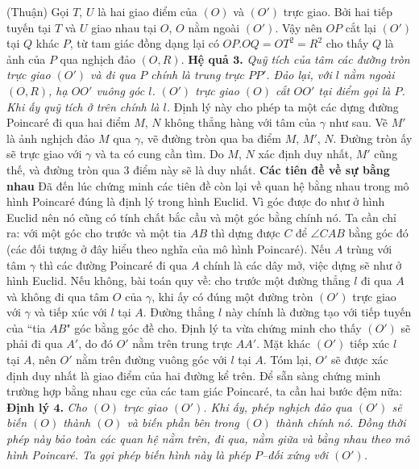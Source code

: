 \begin{multicols}{2}
	\vskip 0.1cm
	(Thuận) Gọi $T$, $U$ là hai giao điểm của $(O)$ và $(O')$ trực giao. Bởi hai tiếp tuyến tại $T$ và $U$ giao nhau tại $O$, $O$ nằm ngoài $(O')$. Vậy nên $OP$ cắt lại $(O')$ tại $Q$ khác $P$, từ tam giác đồng dạng lại có $OP.OQ = OT^2 = R^2$ cho thấy $Q$ là ảnh của $P$ qua nghịch đảo $(O, R)$.
	\vskip 0.1cm
	\textbf{\color{lichsutoanhoc}Hệ quả $\pmb{3}$.} \textit{ Quỹ tích của tâm các đường tròn trực giao $(O')$ và đi qua $P$ chính là trung trực $PP'$.
		Đảo lại, với $l$ nằm ngoài $(O, R)$, hạ $OO'$ vuông góc $l$. $(O')$ trực giao $(O)$ cắt $OO'$ tại điểm gọi là $P$. Khi ấy quỹ tích ở trên chính là $l$.}
	\vskip 0.1cm
	Định lý này cho phép ta một các dựng đường Poincar\'e đi qua hai điểm $M$, $N$ không thẳng hàng với tâm của $\gamma$ như sau. Vẽ $M'$ là ảnh nghịch đảo $M$ qua $\gamma$, vẽ đường tròn qua ba điểm $M$, $M'$, $N$. Đường tròn ấy sẽ trực giao với $\gamma$ và ta có cung cần tìm. Do $M$, $N$ xác định duy nhất, $M'$ cũng thế, và đường tròn qua $3$ điểm này sẽ là duy nhất.
	\vskip 0.1cm
	\textbf{\color{lichsutoanhoc}Các tiên đề về sự bằng nhau}
	\vskip 0.1cm
	Đã đến lúc chứng minh các tiên đề còn lại về quan hệ bằng nhau trong mô hình Poincar\'e đúng là định lý trong hình Euclid.
	\vskip 0.1cm
	Vì góc được đo như ở hình Euclid nên nó cũng có tính chất bắc cầu và một góc bằng chính nó. Ta cần chỉ ra: với một góc cho trước và một tia $AB$ thì dựng được $C$ để $ \angle CAB$ bằng góc đó (các đối tượng ở đây hiểu theo nghĩa của mô hình Poincar\'e). Nếu $A$ trùng với tâm $ \gamma$ thì các đường Poincar\'e đi qua $A$ chính là các dây mở, việc dựng sẽ như ở hình Euclid.
	\vskip 0.1cm
	Nếu không, bài toán quy về: cho trước một đường thẳng $l$ đi qua $A$ và không đi qua tâm $O$ của $\gamma$, khi ấy có đúng một đường tròn $(O')$ trực giao với $\gamma$ và tiếp xúc với $l$ tại $A$. Đường thẳng $l$ này chính là đường tạo với tiếp tuyến của ``tia $AB$" góc bằng góc đề cho. 
	\vskip 0.1cm
	Định lý ta vừa chứng minh cho thấy $(O')$ sẽ phải đi qua $A'$, do đó $O'$ nằm trên trung trực $AA'$. Mặt khác $(O')$ tiếp xúc $l$ tại $A$, nên $O'$ nằm trên đường vuông góc với $l$ tại $A$. Tóm lại, $O'$ sẽ được xác định duy nhất là giao điểm của hai đường kể trên.
	\vskip 0.1cm
	Để sẵn sàng chứng minh trường hợp bằng nhau cgc của các tam giác Poincar\'e, ta cần hai bước đệm nữa:
	\vskip 0.1cm
	\textbf{\color{lichsutoanhoc}Định lý $\pmb{4}$.} \textit{ Cho $(O)$ trực giao $(O')$. Khi ấy, phép nghịch đảo qua $(O')$ sẽ biến $(O)$ thành $(O)$ và biến phần bên trong $(O)$ thành chính nó. Đồng thời phép này bảo toàn các quan hệ nằm trên, đi qua, nằm giữa và bằng nhau theo mô hình Poincar\'e. Ta gọi phép biến hình này là phép $P$--đối xứng với $(O')$.
}
\end{multicols}

